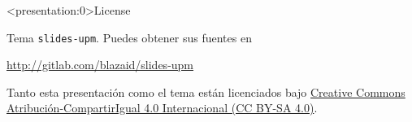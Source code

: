 \begin{frame}<presentation:0>{License}
    \begin{block}{Tema \texttt{slides-upm}. Puedes obtener sus fuentes en}
        \begin{center}\url{http://gitlab.com/blazaid/slides-upm}\end{center}
    \end{block}
  
    Tanto esta presentación como el tema están licenciados bajo \href{http://creativecommons.org/licenses/by-sa/4.0/}{Creative Commons
  Atribución-CompartirIgual 4.0 Internacional (CC BY-SA 4.0)}.
    \begin{center}\ccbysa\end{center}
\end{frame}


